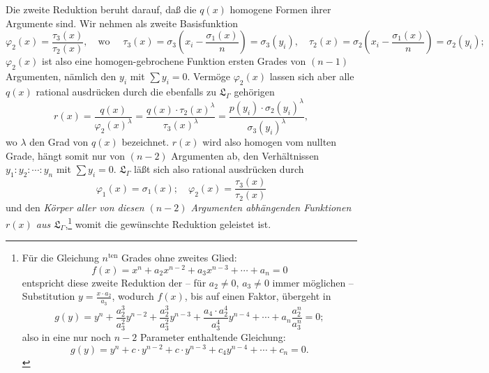 \documentclass[11pt]{article}
\begin{document}
Die zweite Reduktion beruht darauf, daß die $q(x)$ homogene Formen ihrer Argumente sind. Wir nehmen als zweite Basisfunktion
\[
\varphi_2(x)=\frac{\tau_3(x)}{\tau_2(x)},\quad \text{wo }\quad
\tau_3(x)=\sigma_3\left(x_i-\frac{\sigma_1(x)}{n}\right)=\sigma_3(y_i),\quad
\tau_2(x)=\sigma_2\left(x_i-\frac{\sigma_1(x)}{n}\right)=\sigma_2(y_i);
\]
$\varphi_2(x)$ ist also eine homogen-gebrochene Funktion ersten Grades von $(n-1)$ Argumenten, nämlich den $y_i$ mit $\sum y_i=0$. Vermöge $\varphi_2(x)$ lassen sich aber alle $q(x)$ rational ausdrücken durch die ebenfalls zu $\mathfrak L_\Gamma$ gehörigen
\[
r(x)=\frac{q(x)}{\varphi_2(x)^\lambda}=\frac{q(x)\cdot\tau_2(x)^\lambda}{\tau_3(x)^\lambda}=\frac{p(y_i)\cdot\sigma_2(y_i)^\lambda}{\sigma_3(y_i)^\lambda},
\]
wo $\lambda$ den Grad von $q(x)$ bezeichnet. $r(x)$ wird also homogen vom nullten Grade, hängt somit nur von $(n-2)$ Argumenten ab, den Verhältnissen $y_1:y_2:\cdots:y_n$ mit $\sum y_i=0$. $\mathfrak L_\Gamma$ läßt sich also rational ausdrücken durch
\[
\varphi_1(x)=\sigma_1(x);\quad \varphi_2(x)=\frac{\tau_3(x)}{\tau_2(x)}
\]
und den \emph{Körper aller von diesen $(n-2)$ Argumenten abhängenden Funktionen $r(x)$ aus $\mathfrak L_\Gamma$},\footnote{Für die Gleichung $n^{\text{ten}}$ Grades ohne zweites Glied:
\[
f(x)=x^n+a_2x^{n-2}+a_3x^{n-3}+\cdots+a_n=0
\]
entspricht diese zweite Reduktion der -- für $a_2\neq0$, $a_3\neq0$ immer möglichen -- Substitution $y=\frac{x\cdot a_2}{a_3}$, wodurch $f(x)$, bis auf einen Faktor, übergeht in
\[
g(y)=y^n+\frac{a_2^3}{a_3^2}y^{n-2}+\frac{a_2^3}{a_3^2}y^{n-3}+\frac{a_4\cdot a_2^4}{a_3^4}y^{n-4}+\cdots+a_n\frac{a_2^n}{a_3^n}=0;
\]
also in eine nur noch $n-2$ Parameter enthaltende Gleichung:
\[
g(y)=y^n+c\cdot y^{n-2}+c\cdot y^{n-3}+c_4y^{n-4}+\cdots+c_n=0.
\]} womit die gewünschte Reduktion geleistet ist.
\end{document}
